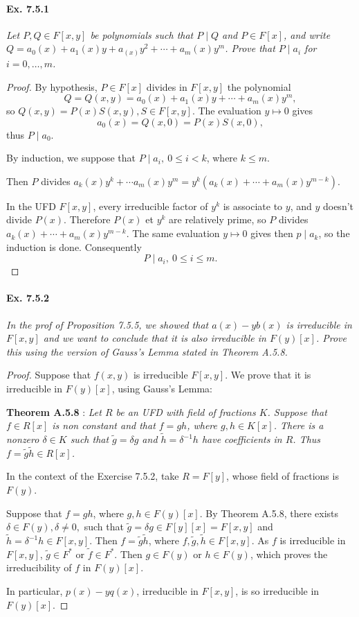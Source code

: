 \documentclass[11pt,a4paper]{article}
\begin{document}
\paragraph{Ex. 7.5.1}

{\it Let $P,Q \in F[x,y]$ be polynomials such that $P\mid Q$ and $P\in F[x]$, and write $Q= a_0(x)+a_1(x)y+a_(x)y^2+\cdots+a_m(x)y^m$. Prove that $P\mid a_i$ for $i=0,\ldots,m$.
}

\begin{proof}
By hypothesis, $P \in F[x]$ divides in $F[x,y]$ the polynomial 
$$Q = Q(x,y) = a_0(x)+a_1(x)y+\cdots+a_m(x)y^m,$$
so $Q(x,y) = P(x)S(x,y) , S \in F[x,y]$. The evaluation $y \mapsto 0$ gives 
$$a_0(x) = Q(x,0) = P(x)S(x,0),$$
thus $P \mid a_0$.

By induction, we suppose that $P \mid a_i, \ 0 \leq i < k$, where $k\leq m$.

Then $P$ divides $a_k(x)y^k+\cdots a_m(x)y^m = y^k(a_k(x)+ \cdots + a_m(x) y^{m-k})$.

In the UFD $F[x,y]$, every irreducible factor of $y^k$ is associate to $y$, and $y$ doesn't divide $P(x)$. Therefore $P(x)$ et $y^k$ are relatively prime, so $P$ divides $a_k(x)+ \cdots + a_m(x) y^{m-k}$. The same evaluation $y\mapsto 0$ gives then $p \mid a_k$, so the induction is done. Consequently
$$P \mid a_i,\  0 \leq i \leq m.$$
\end{proof}

\paragraph{Ex. 7.5.2} 

{\it In the prof of Proposition 7.5.5, we showed that $a(x) - yb(x)$ is irreducible in $F[x,y]$ and we want to conclude that it is also irreducible in $F(y)[x]$. Prove this using the version of Gauss's Lemma stated in Theorem A.5.8.
}

\begin{proof}
Suppose that $f(x,y) $ is irreducible $F[x,y]$.  We prove that it is irreducible in $F(y)[x]$, using Gauss's Lemma: 

{\bf Theorem A.5.8} :
{\it Let $R$ be an UFD with field of fractions $K$. Suppose that $f \in R[x]$ is non constant and that $f = gh$, where $g,h \in K[x]$. There is a nonzero $\delta \in K$ such that $\tilde{g} = \delta g$ and $\tilde{h} = \delta^{-1}h$ have coefficients in $R$. Thus $f = \tilde{g} \tilde{h} \in R[x]$.}

In the context of the Exercise 7.5.2, take $R = F[y]$, whose field of fractions is $F(y)$.

Suppose that $f = gh$, where $g,h \in F(y)[x]$. By Theorem A.5.8, there exists $\delta \in F(y),\delta \neq 0,$ such that $\tilde{g} = \delta g \in F[y][x] = F[x,y]$ and $\tilde{h} = \delta^{-1} h \in F[x,y]$. Then $f = \tilde{g} \tilde{h}$, where $f, \tilde{g},\tilde{h} \in F[x,y]$. As $f$ is irreducible in $F[x,y]$, $\tilde{g} \in F^*$ or $\tilde{f} \in F^*$. Then $g \in F(y)$ or $h\in F(y)$, which proves the irreducibility of $f$ in $F(y)[x]$.

In particular, $p(x) - y q(x)$, irreducible in $F[x,y]$, is so irreducible in $F(y)[x]$.
\end{proof}
\end{document}
